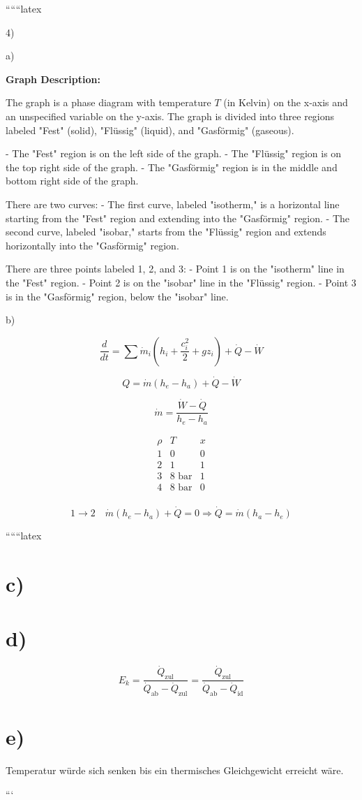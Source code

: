 
``````latex


4) 

a)

\begin{center}
\textbf{Graph Description:}
\end{center}

The graph is a phase diagram with temperature \( T \) (in Kelvin) on the x-axis and an unspecified variable on the y-axis. The graph is divided into three regions labeled "Fest" (solid), "Flüssig" (liquid), and "Gasförmig" (gaseous). 

- The "Fest" region is on the left side of the graph.
- The "Flüssig" region is on the top right side of the graph.
- The "Gasförmig" region is in the middle and bottom right side of the graph.

There are two curves:
- The first curve, labeled "isotherm," is a horizontal line starting from the "Fest" region and extending into the "Gasförmig" region.
- The second curve, labeled "isobar," starts from the "Flüssig" region and extends horizontally into the "Gasförmig" region.

There are three points labeled 1, 2, and 3:
- Point 1 is on the "isotherm" line in the "Fest" region.
- Point 2 is on the "isobar" line in the "Flüssig" region.
- Point 3 is in the "Gasförmig" region, below the "isobar" line.

b)

\[
\frac{d}{dt} = \sum \dot{m}_i (h_i + \frac{c_i^2}{2} + g z_i) + \dot{Q} - \dot{W}
\]

\[
Q = \dot{m} (h_e - h_a) + \dot{Q} - \dot{W}
\]

\[
\dot{m} = \frac{\dot{W} - \dot{Q}}{h_e - h_a}
\]

\[
\begin{array}{ccc}
\rho & T & x \\
1 & 0 & 0 \\
2 & 1 & 1 \\
3 & 8 \text{ bar} & 1 \\
4 & 8 \text{ bar} & 0 \\
\end{array}
\]


\[
1 \rightarrow 2 \quad \dot{m} (h_e - h_a) + \dot{Q} = 0 \Rightarrow \dot{Q} = \dot{m} (h_a - h_e)
\]

``````latex


\section*{c)}

\section*{d)}
\[
E_k = \frac{\dot{Q}_{\text{zul}}}{\dot{Q}_{\text{ab}} - \dot{Q}_{\text{zul}}} = \frac{\dot{Q}_{\text{zul}}}{\dot{Q}_{\text{ab}} - \dot{Q}_{\text{id}}}
\]

\section*{e)}
Temperatur würde sich senken bis ein thermisches Gleichgewicht erreicht wäre.

```